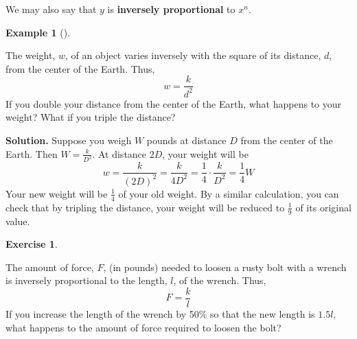 \documentclass[10pt,]{book}
\newcommand{\terminology}[1]{\textbf{#1}}
\theoremstyle{plain}
\theoremstyle{definition}
\theoremstyle{definition}
\theoremstyle{definition}
\newtheorem{example}[theorem]{Example}
\theoremstyle{definition}
\theoremstyle{definition}
\newtheorem{exercise}[theorem]{Exercise}
\numberwithin{equation}{section}
\begin{document}
	We may also say that \(y\) is \terminology{inversely proportional} to \(x^n\).
%
\begin{example}[]\label{example-weight-vs-distance-from-earth}

		The weight, \(w\), of an object varies inversely with the square of its distance, \(d\), from the center of the Earth. Thus,
		\begin{equation*}w = \frac{k}{d^2}\end{equation*}
		If you double your distance from the center of the Earth, what happens to your weight? What if you triple the distance?
\par\medskip\noindent%
\textbf{Solution.}\quad 
	Suppose you weigh \(W\) pounds at distance \(D\) from the center of the Earth. Then 	\(W = \frac{k}{D^2}\). At distance \(2D\), your weight will be
	\begin{equation*}w = \frac{k}{(2D)^2}= \frac{k}{4D^2}= \frac{1}{4}\cdot\frac{k}{D^2}
		= \frac{1}{4}W\end{equation*}
	Your new weight will be \(\frac{1}{4}\) of your old weight. By a similar calculation, you can check that by tripling the distance, your weight will be reduced to \(\frac{1}{9}\) of its original value.
%
\end{example}
\begin{exercise}\label{exercise-rusty-bolt}

	The amount of force, \(F\), (in pounds) needed to loosen a rusty bolt with a wrench is inversely proportional to the length, \(l\), of the wrench. Thus,
	\begin{equation*}F = \frac{k}{l}\end{equation*}
	If you increase the length of the wrench by 50\% so that the new length is \(1.5l\), what happens to the amount of force required to loosen the bolt?
\end{exercise}
\par
\end{document}
